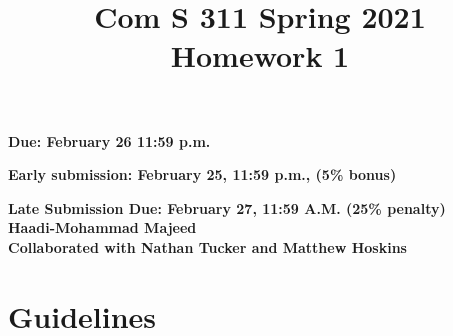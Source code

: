 \documentclass[11pt]{amsart}
\begin{document}


\title{
Com S 311 Spring 2021\\
Homework 1
}

\maketitle


\vspace{-.8cm}
\begin{center}
{\bf Due:  February 26 11:59 p.m.}

\smallskip
\textbf{Early submission: February 25, 11:59 p.m., (5\% bonus)}

\smallskip
{\bf Late Submission Due: February 27, 11:59 \textbf{A.M.} (25\% penalty)}
\smallskip
\textbf{\\Haadi-Mohammad Majeed\\Collaborated with Nathan Tucker and Matthew Hoskins} 
\end{center}

\medskip

\section*{Guidelines}
\end{document}
